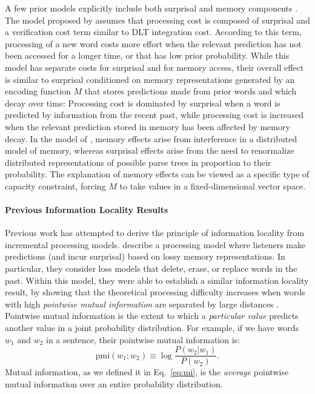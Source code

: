 A few prior models explicitly include both surprisal and memory components \citep{demberg2009computational,rasmussen2018left}.
The model proposed by \citet{demberg2009computational} assumes that processing cost is composed of surprisal and a verification cost term similar to DLT integration cost.
According to this term, processing of a new word costs more effort when the relevant prediction has not been accessed for a longer time, or that has low prior probability.
While this model has separate costs for surprisal and for memory access, their overall effect is similar to surprisal conditioned on memory representations generated by an encoding function $M$ that stores predictions made from prior words and which decay over time:
Processing cost is dominated by surprisal when a word is predicted by information from the recent past, while processing cost is increased when the relevant prediction stored in memory has been affected by memory decay.
In the model of \citet{rasmussen2018left}, memory effects arise from interference in a distributed model of memory, whereas surprisal effects arise from the need to renormalize distributed representations of possible parse trees in proportion to their probability.
The explanation of memory effects can be viewed as a specific type of capacity constraint, forcing $M$ to take values in a fixed-dimensional vector space.



\paragraph{Previous Information Locality Results}

Previous work has attempted to derive the principle of information locality from incremental processing models. 
\citet{futrell2020lossy} describe a processing model where listeners make predictions (and incur surprisal) based on lossy memory representations.
In particular, they consider loss models that delete, erase, or replace words in the past.
Within this model, they were able to establish a similar information locality result, by showing that the theoretical processing difficulty increases when words with high \emph{pointwise mutual information} are separated by large distances \citep{futrell2019information,futrell2020lossy}. Pointwise mutual information is the extent to which a \emph{particular value} predicts another value in a joint probability distribution. For example, if we have words $w_1$ and $w_2$ in a sentence, their pointwise mutual information is:
\begin{equation*}
    \text{pmi}(w_1; w_2) \equiv \log \frac{P(w_2|w_1)}{P(w_2)}.
\end{equation*}
Mutual information, as we defined it in Eq.~\ref{eq:mi}, is the \emph{average} pointwise mutual information over an entire probability distribution.

